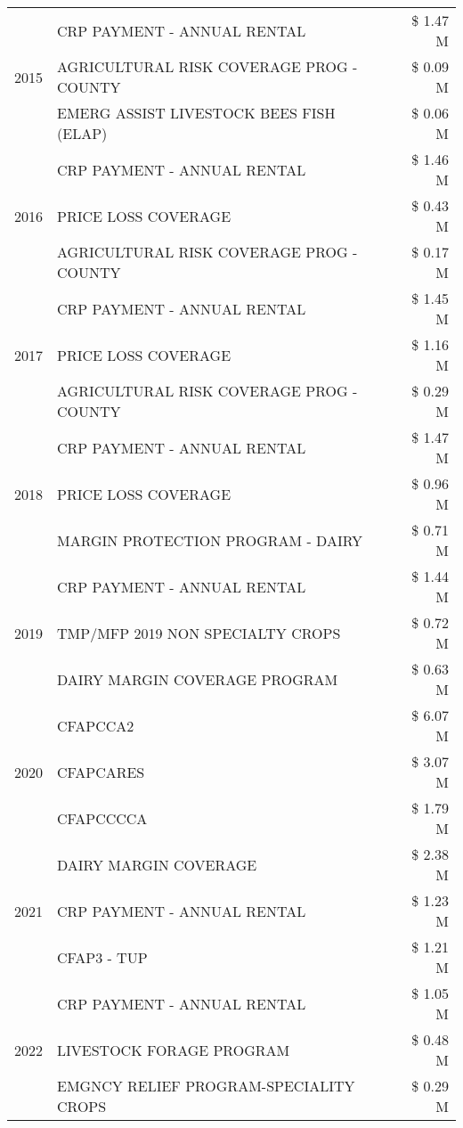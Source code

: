 \begin{tabular}{llr}
\cline{1-3}
\multirow[t]{3}{*}{2015} & CRP PAYMENT - ANNUAL RENTAL & \$ 1.47 M \\
 & AGRICULTURAL RISK COVERAGE PROG - COUNTY & \$ 0.09 M \\
 & EMERG ASSIST LIVESTOCK BEES FISH (ELAP) & \$ 0.06 M \\
\cline{1-3}
\multirow[t]{3}{*}{2016} & CRP PAYMENT - ANNUAL RENTAL & \$ 1.46 M \\
 & PRICE LOSS COVERAGE & \$ 0.43 M \\
 & AGRICULTURAL RISK COVERAGE PROG - COUNTY & \$ 0.17 M \\
\cline{1-3}
\multirow[t]{3}{*}{2017} & CRP PAYMENT - ANNUAL RENTAL & \$ 1.45 M \\
 & PRICE LOSS COVERAGE & \$ 1.16 M \\
 & AGRICULTURAL RISK COVERAGE PROG - COUNTY & \$ 0.29 M \\
\cline{1-3}
\multirow[t]{3}{*}{2018} & CRP PAYMENT - ANNUAL RENTAL & \$ 1.47 M \\
 & PRICE LOSS COVERAGE & \$ 0.96 M \\
 & MARGIN PROTECTION PROGRAM - DAIRY & \$ 0.71 M \\
\cline{1-3}
\multirow[t]{3}{*}{2019} & CRP PAYMENT - ANNUAL RENTAL & \$ 1.44 M \\
 & TMP/MFP 2019 NON SPECIALTY CROPS & \$ 0.72 M \\
 & DAIRY MARGIN COVERAGE PROGRAM & \$ 0.63 M \\
\cline{1-3}
\multirow[t]{3}{*}{2020} & CFAPCCA2 & \$ 6.07 M \\
 & CFAPCARES & \$ 3.07 M \\
 & CFAPCCCCA & \$ 1.79 M \\
\cline{1-3}
\multirow[t]{3}{*}{2021} & DAIRY MARGIN COVERAGE & \$ 2.38 M \\
 & CRP PAYMENT - ANNUAL RENTAL & \$ 1.23 M \\
 & CFAP3 - TUP & \$ 1.21 M \\
\cline{1-3}
\multirow[t]{3}{*}{2022} & CRP PAYMENT - ANNUAL RENTAL & \$ 1.05 M \\
 & LIVESTOCK FORAGE PROGRAM & \$ 0.48 M \\
 & EMGNCY RELIEF PROGRAM-SPECIALITY CROPS & \$ 0.29 M \\
\cline{1-3}
\bottomrule
\end{tabular}

